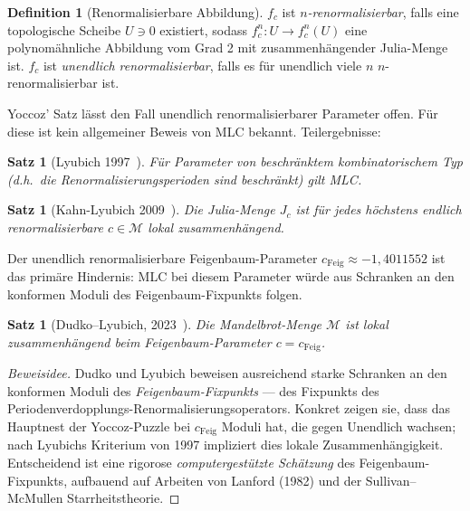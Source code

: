 \documentclass[12pt,a4paper]{amsart}
\newtheorem{satz}[theorem]{Satz}
\theoremstyle{definition}
\newtheorem{definition_de}[theorem]{Definition}
\theoremstyle{remark}
\begin{document}
\begin{definition_de}[Renormalisierbare Abbildung]
$f_c$ ist \emph{$n$-renormalisierbar}, falls eine topologische Scheibe
$U \ni 0$ existiert, sodass $f_c^n \colon U \to f_c^n(U)$ eine
polynomähnliche Abbildung vom Grad 2 mit zusammenhängender Julia-Menge ist.
$f_c$ ist \emph{unendlich renormalisierbar}, falls es für unendlich viele $n$
$n$-renormalisierbar ist.
\end{definition_de}

Yoccoz' Satz lässt den Fall unendlich renormalisierbarer Parameter offen.
Für diese ist kein allgemeiner Beweis von MLC bekannt. Teilergebnisse:

\begin{satz}[Lyubich 1997~\cite{Lyubich1997}]
Für Parameter von \emph{beschränktem kombinatorischem Typ} (d.h.\ die
Renormalisierungsperioden sind beschränkt) gilt MLC.
\end{satz}

\begin{satz}[Kahn-Lyubich 2009~\cite{KahnLyubich2009}]
Die Julia-Menge $J_c$ ist für jedes höchstens endlich renormalisierbare
$c \in \mathcal{M}$ lokal zusammenhängend.
\end{satz}

Der unendlich renormalisierbare Feigenbaum-Parameter
$c_{\mathrm{Feig}} \approx -1{,}4011552$ ist das primäre Hindernis:
MLC bei diesem Parameter würde aus Schranken an den konformen Moduli
des Feigenbaum-Fixpunkts folgen.

\begin{satz}[Dudko--Lyubich, 2023~\cite{DudkoLyubich2023}]
\label{satz:DudkoLyubich}
Die Mandelbrot-Menge $\mathcal{M}$ ist lokal zusammenhängend beim
Feigenbaum-Parameter $c = c_{\mathrm{Feig}}$.
\end{satz}

\begin{proof}[Beweisidee]
Dudko und Lyubich beweisen ausreichend starke Schranken an den konformen
Moduli des \emph{Feigenbaum-Fixpunkts} — des Fixpunkts des
Periodenverdopplungs-Renormalisierungsoperators.  Konkret zeigen sie,
dass das Hauptnest der Yoccoz-Puzzle bei $c_{\mathrm{Feig}}$ Moduli
hat, die gegen Unendlich wachsen; nach Lyubichs Kriterium von 1997
impliziert dies lokale Zusammenhängigkeit.  Entscheidend ist eine
rigorose \emph{computergestützte Schätzung} des Feigenbaum-Fixpunkts,
aufbauend auf Arbeiten von Lanford (1982) und der Sullivan--McMullen
Starrheitstheorie.
\end{proof}
\end{document}
